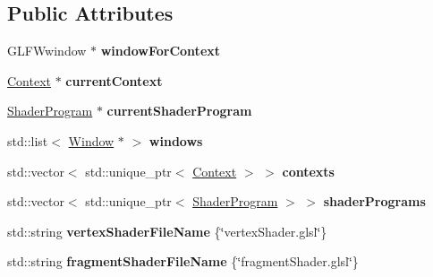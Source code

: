 \subsection*{Public Attributes}
\begin{DoxyCompactItemize}
\item 
\hypertarget{classMyGL_ad9da207aec683d4e52190aa6ca4c8103}{}G\+L\+F\+Wwindow $\ast$ {\bfseries window\+For\+Context}\label{classMyGL_ad9da207aec683d4e52190aa6ca4c8103}

\item 
\hypertarget{classMyGL_a64f2144f0057b9b37b14ebc9a94d4f75}{}\hyperlink{classContext}{Context} $\ast$ {\bfseries current\+Context}\label{classMyGL_a64f2144f0057b9b37b14ebc9a94d4f75}

\item 
\hypertarget{classMyGL_ae0a53010a55ec6920697018b90df6ee2}{}\hyperlink{classShaderProgram}{Shader\+Program} $\ast$ {\bfseries current\+Shader\+Program}\label{classMyGL_ae0a53010a55ec6920697018b90df6ee2}

\item 
\hypertarget{classMyGL_ab7bc049b7ce8d79fe244a1dbd2e63bf0}{}std\+::list$<$ \hyperlink{classWindow}{Window} $\ast$ $>$ {\bfseries windows}\label{classMyGL_ab7bc049b7ce8d79fe244a1dbd2e63bf0}

\item 
\hypertarget{classMyGL_a349d4b9d76a0427c048ab86c75346c8f}{}std\+::vector$<$ std\+::unique\+\_\+ptr$<$ \hyperlink{classContext}{Context} $>$ $>$ {\bfseries contexts}\label{classMyGL_a349d4b9d76a0427c048ab86c75346c8f}

\item 
\hypertarget{classMyGL_ad538dbfd1535c800bb09cab39e85226b}{}std\+::vector$<$ std\+::unique\+\_\+ptr$<$ \hyperlink{classShaderProgram}{Shader\+Program} $>$ $>$ {\bfseries shader\+Programs}\label{classMyGL_ad538dbfd1535c800bb09cab39e85226b}

\item 
\hypertarget{classMyGL_ae9b56982144e61ad3cdbd1941ece779c}{}std\+::string {\bfseries vertex\+Shader\+File\+Name} \{\char`\"{}vertex\+Shader.\+glsl\char`\"{}\}\label{classMyGL_ae9b56982144e61ad3cdbd1941ece779c}

\item 
\hypertarget{classMyGL_a8366fc1559f38d409baefeb5df9a1d59}{}std\+::string {\bfseries fragment\+Shader\+File\+Name} \{\char`\"{}fragment\+Shader.\+glsl\char`\"{}\}\label{classMyGL_a8366fc1559f38d409baefeb5df9a1d59}

\end{DoxyCompactItemize}


